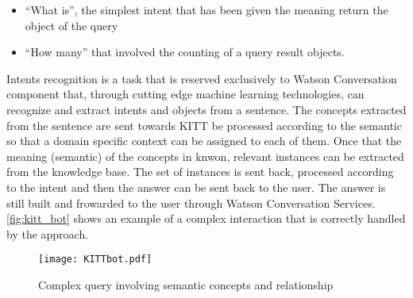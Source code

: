 \begin{itemize}
 \item ``What is'', the simplest intent that has been given the meaning return the object of the query
 \item ``How many'' that involved the counting of a query result objects.
\end{itemize}
Intents recognition is a task that is reserved exclusively to Watson Conversation component that, through cutting edge machine learning technologies, can recognize and extract intents and objects from a sentence.
The concepts extracted from the sentence are sent towards KITT be processed according to the semantic so that a domain specific context can be assigned to each of them.
Once that the meaning (semantic) of the concepts in knwon, relevant instances can be extracted from the knowledge base. The set of instances is sent back, processed according to the intent and then the answer can be sent back to the user. The answer is still built and frowarded to the user through Watson Conversation Services.
\autoref{fig:kitt_bot} shows an example of a complex interaction that is correctly handled by the approach.
\begin{figure}
  \centering
  \texttt{[image: KITTbot.pdf]}
  \caption{Complex query involving semantic concepts and relationship}
  \label{fig:kitt_bot}
\end{figure}
